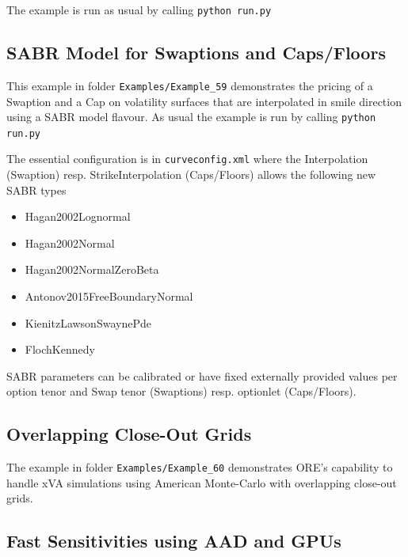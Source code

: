 The example is run as usual by calling {\tt python run.py}

\subsection{SABR Model for Swaptions and Caps/Floors}%
\label{example:59}

This example in folder {\tt Examples/Example\_59} demonstrates the pricing of a Swaption and a Cap on
volatility surfaces that are interpolated in smile direction using a SABR
model flavour. As usual the example is run by calling {\tt python run.py}

The essential configuration is in {\tt curveconfig.xml} where the
Interpolation (Swaption) resp. StrikeInterpolation (Caps/Floors) allows
the following new SABR types
\begin{itemize}
\item Hagan2002Lognormal
\item Hagan2002Normal
\item Hagan2002NormalZeroBeta
\item Antonov2015FreeBoundaryNormal
\item KienitzLawsonSwaynePde
\item FlochKennedy
\end{itemize}
SABR parameters can be calibrated or have fixed externally provided values
per option tenor and Swap tenor (Swaptions) resp. optionlet (Caps/Floors).

\subsection{Overlapping Close-Out Grids}%
\label{example:60}

The example in folder {\tt Examples/Example\_60} demonstrates ORE's capability to handle xVA simulations using American Monte-Carlo with overlapping close-out grids.

\subsection{Fast Sensitivities using AAD and GPUs}%
\label{example:61}


